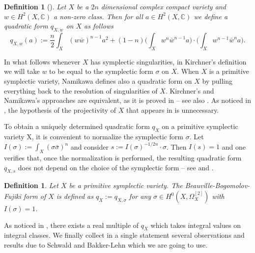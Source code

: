 \documentclass[12pt,reqno]{amsart}
\newtheorem{definition}[thm]{Definition}
\theoremstyle{plain}
\theoremstyle{definition}
\begin{document}
\begin{definition}[{\cite[Definition 3.2.1]{Kir}}]\label{def:q-kir}
Let $X$ be a $2n$ dimensional complex compact variety and $w\in H^2(X,\mathbb C)$ a non-zero class. 
 Then for all $a\in H^2(X,\mathbb C)$ we define a  quadratic form $q_{X,w}$ on $X$ as follows
 $$
 q_{X,w}(a):=\frac{n}{2}\int_{ X} ( w \bar{ w})^{n-1}a^2 +
 (1-n)\bigg(\int_{ X} w^n \bar{ w}^{n-1}a \bigg)\cdot
 \bigg(\int_{ X} w^{n-1} \bar{ w}^{n}a\bigg).
 $$
\end{definition}
In what follows whenever $X$ has symplectic singularities, in Kirchner's definition we will take $w$ to be equal to the symplectic form $\sigma$ on $X$.
When $X$ is a primitive symplectic variety, Namikawa defines also a quadratic form on $X$ by pulling everything back to the resolution of singularities of $X$. 
Kirchner's and Namikawa's  approaches are equivalent, as it is proved in \cite[Proposition 3.2.15]{Kir} -- see also \cite{Sch}. As noticed in \cite[Section 5.1]{BL2}, the hypothesis of the projectivity of $X$ that appears in \cite{Sch} is unnecessary. 

To obtain a uniquely determined quadratic form $q_X$ on a primitive
symplectic variety X, it is convenient to normalize the symplectic form $\sigma$. Let $I(\sigma):=\int_{ X} ( \sigma \bar{ \sigma})^n$ and consider
$s:=I(\sigma)^{-1/2n}\cdot \sigma$. Then $I(s)=1$ and
one verifies that,  once the normalization is performed, the resulting quadratic form 
$q_{X,s}$ does not depend on the choice of the symplectic form -- see \cite[Lemma 22]{Sch} and \cite[Lemma 5.3]{BL2}. 

\begin{definition}
\label{def:normed-q}
Let $X$ be a primitive symplectic variety. The Beauville-Bogomolov-Fujiki form of $X$
is defined as $q_X:=q_{X,\sigma}$ for any $\sigma\in H^0(X,\Omega_X^{[2]})$ with $I(\sigma)=1$. 

\end{definition}
As noticed in \cite[Lemma 5.5]{BL2}, there exists a real multiple of $q_X$ which takes integral values on integral classes. We finally collect in a single statement several observations and results due to Schwald and Bakker-Lehn which we are going to use. 
\end{document}
